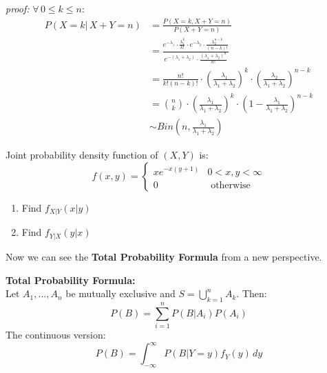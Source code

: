 \documentclass{article}
\begin{document}
\emph{proof:} \quad $\forall\, 0 \leq k \leq n$:
\begin{align*}
    P(X=k|\,X+Y=n) &= \frac{P(X=k,X+Y=n)}{P(X+Y=n)}\\
                   &= \frac{e^{-\lambda_{1}} \cdot \frac{\lambda_{1}^{k}}{k!} \cdot e^{-\lambda_{2}} \cdot \frac{\lambda_{2}^{n-k}}{(n-k)!}}{e^{-(\lambda_{1}+\lambda_{2})} \cdot \frac{(\lambda_{1}+\lambda_{2})^{n}}{n!}}\\
                   &= \frac{n!}{k!(n-k)!} \cdot \left(\frac{\lambda_{1}}{\lambda_{1}+\lambda_{2}}\right)^{k} \cdot \left(\frac{\lambda_{2}}{\lambda_{1}+\lambda_{2}}\right)^{n-k}\\
                   &= \binom{n}{k} \cdot \left(\frac{\lambda_{1}}{\lambda_{1}+\lambda_{2}}\right)^{k} \cdot \left(1-\frac{\lambda_{1}}{\lambda_{1}+\lambda_{2}}\right)^{n-k}\\
                   &\sim Bin(n,\frac{\lambda_{1}}{\lambda_{1}+\lambda_{2}})
\end{align*}



\begin{quiz}
    Joint probability density function of $(X,Y)$ is:
    \begin{equation*}
        f(x,y) = 
        \begin{cases}
            xe^{-x(y+1)} & 0 < x,y < \infty\\
            0 & \text{ otherwise }
        \end{cases}
    \end{equation*}
    \begin{enumerate}
        \item Find $f_{X|Y}(x|y)$
        \item Find $f_{Y|X}(y|x)$
    \end{enumerate}
\end{quiz}
Now we can see the \textbf{Total Probability Formula} from a new perspective.
\begin{definition}
    \textbf{Total Probability Formula:}\\
    Let $A_1,\dots , A_n$ be mutually exclusive and $S = \bigcup^n_{k=1}A_k$. Then:
    \begin{equation*}
        P(B) = \sum^n_{i=1}P(B|A_i)P(A_i)
    \end{equation*}
    The continuous version:
    \begin{equation*}
        P(B) = \int^\infty_{-\infty}P(B | Y = y)f_Y(y) \, dy
    \end{equation*}
\end{definition}
\end{document}
